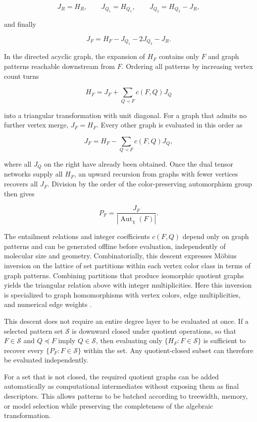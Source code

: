\[
J_R=H_R,\qquad
J_{Q_1}=H_{Q_1},\qquad
J_{Q_2}=H_{Q_2}-J_R,
\]

and finally

\[
J_F=H_F-J_{Q_1}-2J_{Q_2}-J_R.
\]

In the directed acyclic graph, the expansion of \(H_F\) contains only \(F\) and graph patterns reachable downstream from \(F\). Ordering all patterns by increasing vertex count turns

\[
H_F=J_F+\sum_{Q\prec F}c(F,Q)J_Q
\]

into a triangular transformation with unit diagonal. For a graph that admits no further vertex merge, \(J_F=H_F\). Every other graph is evaluated in this order as

\[
J_F=H_F-\sum_{Q\prec F}c(F,Q)J_Q,
\]

where all \(J_Q\) on the right have already been obtained. Once the dual tensor networks supply all \(H_F\), an upward recursion from graphs with fewer vertices recovers all \(J_F\). Division by the order of the color-preserving automorphism group then gives

\[
P_F=\frac{J_F}{|\operatorname{Aut}_{\chi}(F)|}.
\]

The entailment relations and integer coefficients \(c(F,Q)\) depend only on graph patterns and can be generated offline before evaluation, independently of molecular size and geometry. Combinatorially, this descent expresses M\"obius inversion on the lattice of set partitions within each vertex color class in terms of graph patterns. Combining partitions that produce isomorphic quotient graphs yields the triangular relation above with integer multiplicities. Here this inversion is specialized to graph homomorphisms with vertex colors, edge multiplicities, and numerical edge weights \cite{Lovasz1967Structures,Lovasz2012GraphLimits,Curticapean2017Homomorphisms}.

This descent does not require an entire degree layer to be evaluated at once. If a selected pattern set \(\mathcal S\) is downward closed under quotient operations, so that \(F\in\mathcal S\) and \(Q\preceq F\) imply \(Q\in\mathcal S\), then evaluating only \(\{H_F:F\in\mathcal S\}\) is sufficient to recover every \(\{P_F:F\in\mathcal S\}\) within the set. Any quotient-closed subset can therefore be evaluated independently.

For a set that is not closed, the required quotient graphs can be added automatically as computational intermediates without exposing them as final descriptors. This allows patterns to be batched according to treewidth, memory, or model selection while preserving the completeness of the algebraic transformation.

